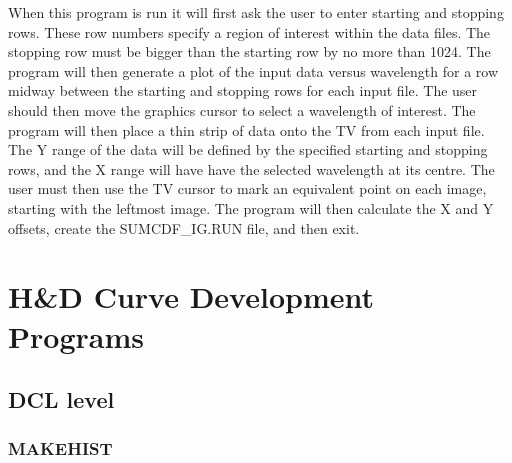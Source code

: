       When this program is run it will first ask the user to enter
   starting and stopping rows.  These row numbers specify a region of
   interest within the data files.  The stopping row must be bigger than
   the starting row by no more than 1024.  The program will then generate
   a plot of the input data versus wavelength for a row midway between the
   starting and stopping rows for each input file.  The user should then
   move the graphics cursor to select a wavelength of interest.  The
   program will then place a thin strip of data onto the TV from each
   input file.  The Y range of the data will be defined by the specified
   starting and stopping rows, and the X range will have have the selected
   wavelength at its centre.  The user must then use the TV cursor to mark
   an equivalent point on each image, starting with the leftmost image.
   The program will then calculate the X and Y offsets, create the
   SUMCDF\_IG.RUN file, and then exit.
\newpage

\section{H\&D Curve Development Programs}

\subsection{DCL level}

\subsubsection{MAKEHIST}

